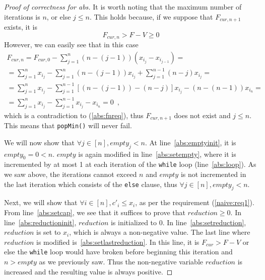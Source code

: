 \begin{proof}[Proof of correctness for abs]
  It is worth noting that the maximum number of iterations is $n$, or else $j \leq n$. This holds because, if we suppose that
  $F_{cur, n+1}$ exists, it is
  \begin{equation}
  \label{abs:fnreq}
    F_{cur, n} > F - V \geq 0
  \end{equation}
  However, we can easily see that in this case
  \begin{equation*}
  \begin{gathered}
    F_{cur, n} = F_{cur, 0} - \sum\limits_{j=1}^n\left(n - \left(j-1\right)\right)\left(x_{i_j} - x_{i_{j-1}}\right) = \\
    = \sum\limits_{j=1}^nx_{i_j} - \sum\limits_{j=1}^n\left(n - \left(j - 1\right)\right)x_{i_j} +
    \sum\limits_{j=1}^{n-1}\left(n - j\right)x_{i_j} = \\
    = \sum\limits_{j=1}^nx_{i_j} - \sum\limits_{j=1}^{n-1}[\left(n - \left(j - 1\right)\right) - \left(n - j\right)]x_{i_j}
    - \left(n - \left(n - 1\right)\right)x_{i_n} = \\
    = \sum\limits_{j=1}^nx_{i_j} - \sum\limits_{j=1}^{n-1}x_{i_j} - x_{i_n} = 0\enspace,
  \end{gathered}
  \end{equation*}
  which is a contradiction to (\ref{abs:fnreq}), thus $F_{cur, n+1}$ does not exist and $j \leq n$. This means
  that \texttt{popMin()} will never fail.

  We will now show that $\forall j \in [n], empty_j < n$. At line~\ref{abs:emptyinit}, it is $empty_0 = 0 < n$. $empty$
  is again modified in line~\ref{abs:setempty}, where it is incremented by at most 1 at each iteration of the \texttt{while}
  loop (line~\ref{abs:loop}). As we saw above, the iterations cannot exceed $n$ and $empty$ is not incremented in the last
  iteration which consists of the \texttt{else} clause, thus $\forall j \in [n], empty_j < n$.

  Next, we will show that $\forall i \in [n], c'_i \leq x_i$, as per the requirement (\ref{naive:req1}). From
  line~\ref{abs:setcap}, we see that it suffices to prove that $reduction \geq 0$. In line~\ref{abs:reductioninit},
  $reduction$ is initialized to 0. In line~\ref{abs:setreduction}, $reduction$ is set to $x_i$, which is always
  a non-negative value. The last line where $reduction$ is modified is~\ref{abs:setlastreduction}. In this line, it is
  $F_{cur} > F - V$ or else the \texttt{while} loop would have broken before beginning this iteration and $n > empty$ as we
  previously saw. Thus the non-negative variable $reduction$ is increased and the resulting value is always positive.


\end{proof}
